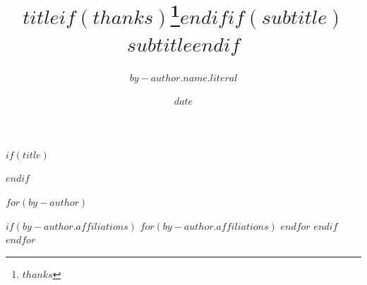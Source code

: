 
$if(title)$
\title{$title$$if(thanks)$\thanks{$thanks$}$endif$$if(subtitle)$\\[0.5em]\large $subtitle$$endif$}
$endif$

$for(by-author)$
  \author{$by-author.name.literal$}
  $if(by-author.affiliations)$
    $for(by-author.affiliations)$
    $endfor$
  $endif$
$endfor$

\date{$date$}
